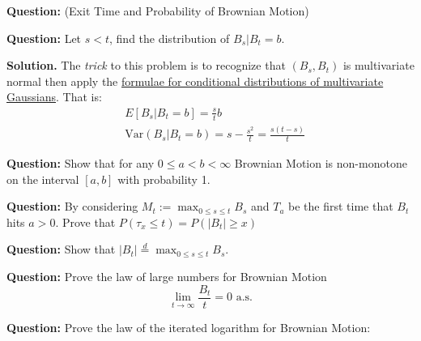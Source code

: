 \documentclass{article}
\begin{document}
\begin{tcolorbox}[colframe=black,colback=gray!5,boxrule=0.5pt]
\textbf{Question:} (Exit Time and Probability of Brownian Motion) 
\end{tcolorbox}

\begin{tcolorbox}[colframe=black,colback=gray!5,boxrule=0.5pt]
\textbf{Question:} Let $s < t$, find the distribution of $B_s | B_t = b$.
\end{tcolorbox}
\textbf{Solution.} The \textit{trick} to this problem is to recognize that $(B_s, B_t)$ is multivariate normal then apply the \href{https://online.stat.psu.edu/stat505/lesson/6/6.1}{formulae for conditional distributions of multivariate Gaussians}. That is: 
\begin{align*}
    & E[B_s | B_t=b] = \frac{s}{t}b \\
    &\text{Var}(B_s | B_t=b) = s-\frac{s^2}{t} = \frac{s(t-s)}{t}
\end{align*}

\begin{tcolorbox}[colframe=black,colback=gray!5,boxrule=0.5pt]
\textbf{Question:} Show that for any $0\leq a < b<\infty$ Brownian Motion is non-monotone on the interval $[a,b]$ with probability 1.  
\end{tcolorbox}


\begin{tcolorbox}[colframe=black,colback=gray!5,boxrule=0.5pt]
\textbf{Question:} By considering $M_t := \max_{0\leq s \leq t} B_s$ and $T_a$ be the first time that $B_t$ hits $a > 0$. Prove that $P(\tau_x\leq t) = P(|B_t|\geq x)$  
\end{tcolorbox}

\begin{tcolorbox}[colframe=black,colback=gray!5,boxrule=0.5pt]
\textbf{Question:} Show that $|B_t| \stackrel{d}{=} \max_{0\leq s\leq t} B_s$.
\end{tcolorbox}

\begin{tcolorbox}[colframe=black,colback=gray!5,boxrule=0.5pt]
\textbf{Question:} Prove the law of large numbers for Brownian Motion
$$\lim_{t\to\infty}\frac{B_t}{t} = 0 \text{ a.s.}$$
\end{tcolorbox}

\begin{tcolorbox}[colframe=black,colback=gray!5,boxrule=0.5pt]
\textbf{Question:} Prove the law of the iterated logarithm for Brownian Motion:
\end{tcolorbox}
\end{document}
